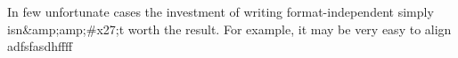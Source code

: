 
In few unfortunate cases the investment of writing format-independent \latex simply isn&amp;amp;#x27;t worth the result. For example, it may be very easy to align adfsfasdhffff